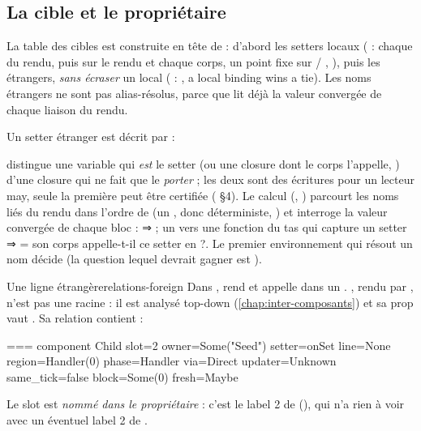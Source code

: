 \subsection{La cible et le propriétaire}

La table des cibles est construite en tête de  : d'abord les setters locaux ( : chaque  du rendu, puis  sur le rendu et chaque corps, un point fixe sur  / , ), puis les étrangers, \emph{sans écraser} un local ( : , \og a local binding wins a tie\fg{}). Les noms étrangers ne sont pas alias-résolus, parce que  lit déjà la valeur convergée de chaque liaison du rendu.

Un setter étranger est décrit par  :


 distingue une variable qui \emph{est} le setter (ou une closure dont le corps l'appelle, ) d'une closure qui ne fait que le \emph{porter} ; les deux sont des écritures pour un lecteur may, seule la première peut être certifiée ( §4). Le calcul (, ) parcourt les noms liés du rendu dans l'ordre de  (un , donc déterministe, ) et interroge la valeur convergée de chaque bloc :  ⇒  ; un  vers une fonction du tas qui capture un setter ⇒  = \og son corps appelle-t-il ce setter en  ?\fg{}. Le premier environnement qui résout un nom décide (la question \og lequel devrait gagner\fg{} est ).

\begin{exemple}{Une ligne étrangère}{relations-foreign}
Dans ,  rend  et  appelle  dans un . , rendu par , n'est pas une racine : il est analysé top-down (\cref{chap:inter-composants}) et sa prop  vaut . Sa relation contient :
\begin{sortie}
=== component Child
  slot=2 owner=Some("Seed") setter=onSet line=None region=Handler(0) phase=Handler via=Direct updater=Unknown same_tick=false block=Some(0) fresh=Maybe
\end{sortie}
Le slot est \emph{nommé dans le propriétaire} : c'est le label 2 de  (), qui n'a rien à voir avec un éventuel label 2 de .
\end{exemple}

